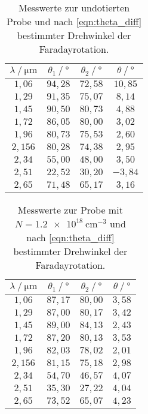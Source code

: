 \begin{table}
  \centering
  \caption{Messwerte zur undotierten Probe und nach \autoref{eqn:theta_diff} bestimmter Drehwinkel der Faradayrotation.}
  \label{tab:mw1}
  \begin{tabular}{c c c c}
    \toprule
    $\lambda \mathbin{/} \unit{\micro\meter}$ & $\theta_{1} \mathbin{/} \unit{\degree}$ & $\theta_{2} \mathbin{/} \unit{\degree}$ &%
     $\theta \mathbin{/} \unit{\degree}$ \\
    \midrule
    $1,06 $ & $94,28$ & $72,58$ & $10,85$ \\
    $1,29 $ & $91,35$ & $75,07$ & $ 8,14$ \\
    $1,45 $ & $90,50$ & $80,73$ & $ 4,88$ \\
    $1,72 $ & $86,05$ & $80,00$ & $ 3,02$ \\
    $1,96 $ & $80,73$ & $75,53$ & $ 2,60$ \\
    $2,156$ & $80,28$ & $74,38$ & $ 2,95$ \\
    $2,34 $ & $55,00$ & $48,00$ & $ 3,50$ \\
    $2,51 $ & $22,52$ & $30,20$ & $-3,84$ \\
    $2,65 $ & $71,48$ & $65,17$ & $ 3,16$ \\
    \bottomrule
  \end{tabular}
\end{table}

\begin{table}
  \centering
  \caption{Messwerte zur Probe mit $N = \qty{1.2e18}{\centi\metre^{-3}}$ und nach \autoref{eqn:theta_diff} bestimmter Drehwinkel der Faradayrotation.}
  \label{tab:mw2}
  \begin{tabular}{c c c c}
    \toprule
    $\lambda \mathbin{/} \unit{\micro\meter}$ & $\theta_{1} \mathbin{/} \unit{\degree}$ & $\theta_{2} \mathbin{/} \unit{\degree}$ &%
     $\theta \mathbin{/} \unit{\degree}$ \\
    \midrule
    $1,06 $ & $87,17$ & $80,00$ & $3,58$ \\
    $1,29 $ & $87,00$ & $80,17$ & $3,42$ \\
    $1,45 $ & $89,00$ & $84,13$ & $2,43$ \\
    $1,72 $ & $87,20$ & $80,13$ & $3,53$ \\
    $1,96 $ & $82,03$ & $78,02$ & $2,01$ \\
    $2,156$ & $81,15$ & $75,18$ & $2,98$ \\
    $2,34 $ & $54,70$ & $46,57$ & $4,07$ \\
    $2,51 $ & $35,30$ & $27,22$ & $4,04$ \\
    $2,65 $ & $73,52$ & $65,07$ & $4,23$ \\
    \bottomrule
  \end{tabular}
\end{table}

